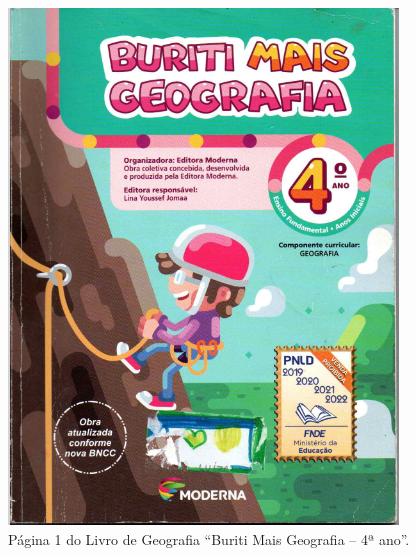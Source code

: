 \documentclass[portuguese]{textolivre}
\begin{document}
\begin{figure}[htbp]
 \centering
 \begin{minipage}{.45\textwidth}
 \includegraphics[width=\textwidth]{Fig1.png}
 \caption{Página 1 do Livro de Geografia “Buriti Mais Geografia – 4ª ano”.}
 \label{fig1}
 \end{minipage}%
 \hfill
 \begin{minipage}{0.45\textwidth}

\end{minipage}
\end{figure}
\end{document}
